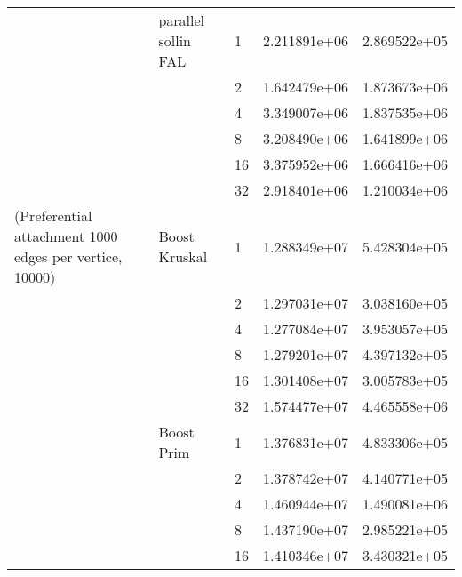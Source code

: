 \begin{tabular}{lllrr}
                                                       & parallel sollin FAL & 1  &  2.211891e+06 &  2.869522e+05 \\
                                                       &                     & 2  &  1.642479e+06 &  1.873673e+06 \\
                                                       &                     & 4  &  3.349007e+06 &  1.837535e+06 \\
                                                       &                     & 8  &  3.208490e+06 &  1.641899e+06 \\
                                                       &                     & 16 &  3.375952e+06 &  1.666416e+06 \\
                                                       &                     & 32 &  2.918401e+06 &  1.210034e+06 \\
(Preferential attachment 1000 edges per vertice, 10000) & Boost Kruskal & 1  &  1.288349e+07 &  5.428304e+05 \\
                                                       &                     & 2  &  1.297031e+07 &  3.038160e+05 \\
                                                       &                     & 4  &  1.277084e+07 &  3.953057e+05 \\
                                                       &                     & 8  &  1.279201e+07 &  4.397132e+05 \\
                                                       &                     & 16 &  1.301408e+07 &  3.005783e+05 \\
                                                       &                     & 32 &  1.574477e+07 &  4.465558e+06 \\
                                                       & Boost Prim & 1  &  1.376831e+07 &  4.833306e+05 \\
                                                       &                     & 2  &  1.378742e+07 &  4.140771e+05 \\
                                                       &                     & 4  &  1.460944e+07 &  1.490081e+06 \\
                                                       &                     & 8  &  1.437190e+07 &  2.985221e+05 \\
                                                       &                     & 16 &  1.410346e+07 &  3.430321e+05 \\

\end{tabular}
